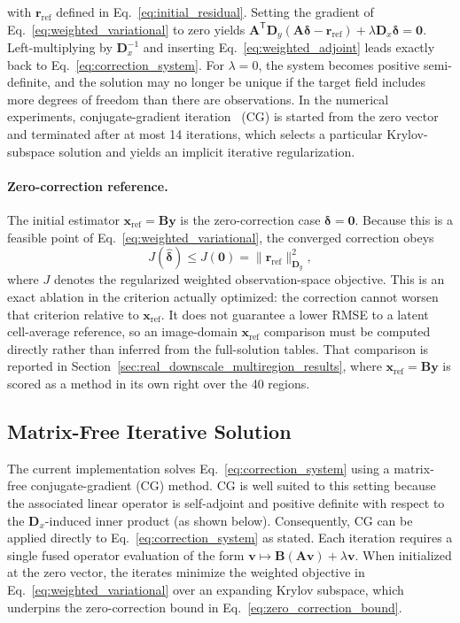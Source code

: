 \documentclass[journal]{IEEEtran}
\begin{document}
with $\mathbf r_{\mathrm{ref}}$ defined in Eq.~\eqref{eq:initial_residual}. Setting the gradient of Eq.~\eqref{eq:weighted_variational} to zero yields $\mathbf A^{\mathsf T}\mathbf D_y(\mathbf A\boldsymbol\delta-\mathbf r_{\mathrm{ref}}) +\lambda\mathbf D_x\boldsymbol\delta=\mathbf 0$. Left-multiplying by $\mathbf D_x^{-1}$ and inserting Eq.~\eqref{eq:weighted_adjoint} leads exactly back to Eq.~\eqref{eq:correction_system}. For $\lambda=0$, the system becomes positive semi-definite, and the solution may no longer be unique if the target field includes more degrees of freedom than there are observations. In the numerical experiments, conjugate-gradient iteration~\cite{hestenes1952cg} (CG) is started from the zero vector and terminated after at most 14 iterations, which selects a particular Krylov-subspace solution and yields an implicit iterative regularization.

\paragraph{Zero-correction reference.}
The initial estimator $\mathbf x_{\mathrm{ref}}=\mathbf B\mathbf y$ is the
zero-correction case $\boldsymbol\delta=\mathbf 0$. Because this is a feasible
point of Eq.~\eqref{eq:weighted_variational}, the converged correction obeys
\begin{equation}
J(\widehat{\boldsymbol\delta})\leq J(\mathbf 0)
=\|\mathbf r_{\mathrm{ref}}\|_{\mathbf D_y}^{2},
\label{eq:zero_correction_bound}
\end{equation}
where $J$ denotes the regularized weighted observation-space objective. This
is an exact ablation in the criterion actually optimized: the correction
cannot worsen that criterion relative to $\mathbf x_{\mathrm{ref}}$. It does
not guarantee a lower RMSE to a latent cell-average reference, so an
image-domain $\mathbf x_{\mathrm{ref}}$ comparison must be computed directly
rather than inferred from the full-solution tables. That comparison is
reported in Section~\ref{sec:real_downscale_multiregion_results}, where
$\mathbf x_{\mathrm{ref}}=\mathbf B\mathbf y$ is scored as a method in its
own right over the 40 regions.

\subsection{Matrix-Free Iterative Solution}
\label{sec:matrix_free_solution}
The current implementation solves Eq.~\eqref{eq:correction_system} using a matrix-free conjugate-gradient (CG) method. CG is well suited to this setting because the associated linear operator is self-adjoint and positive definite with respect to the $\mathbf D_x$-induced inner product (as shown below). Consequently, CG can be applied directly to Eq.~\eqref{eq:correction_system} as stated. Each iteration requires a single fused operator evaluation of the form $\mathbf v \mapsto \mathbf B(\mathbf A\mathbf v) + \lambda \mathbf v$. When initialized at the zero vector, the iterates minimize the weighted objective in Eq.~\eqref{eq:weighted_variational} over an expanding Krylov subspace, which underpins the zero-correction bound in Eq.~\eqref{eq:zero_correction_bound}. 
\end{document}
